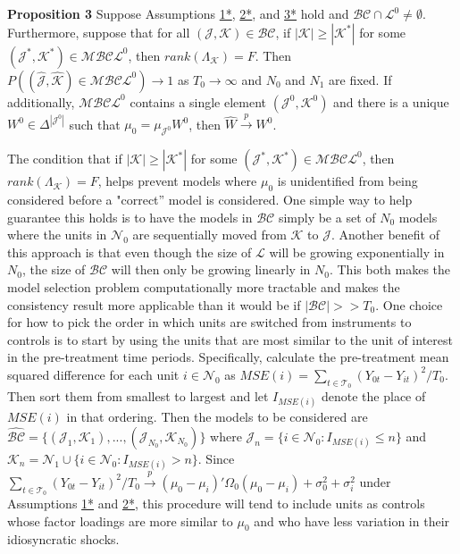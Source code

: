 \documentclass{article}
\begin{document}
\textbf{Proposition 3}\label{P3} Suppose Assumptions \hyperref[A1*]{1*}, \hyperref[A2*]{2*}, and \hyperref[A3*]{3*} hold and $\mathcal{BC} \cap \mathcal{L}^0 \ne \emptyset$. Furthermore, suppose that for all $(\mathcal{J},\mathcal{K}) \in \mathcal{BC}$, if $|\mathcal{K}| \geq |\mathcal{K}^*|$ for some $(\mathcal{J}^*,\mathcal{K}^*) \in \mathcal{MBCL}^0$, then $rank(\Lambda_{\mathcal{K}}) = F$. Then $P((\hat{\mathcal{J}},\hat{\mathcal{K}}) \in \mathcal{MBCL}^0) \rightarrow 1$ as $T_0 \rightarrow \infty$ and $N_0$ and $N_1$ are fixed. If additionally, $\mathcal{MBCL}^0$ contains a single element $(\mathcal{J}^0,\mathcal{K}^0)$ and there is a unique $W^0 \in \Delta^{|\mathcal{J}^0|}$ such that $\mu_0 = \mu_{\mathcal{J}^0} W^0$, then $\hat{W} \overset{p}{\rightarrow} W^0$. 
\par
The condition that if $|\mathcal{K}| \geq |\mathcal{K}^*|$ for some $(\mathcal{J}^*,\mathcal{K}^*) \in \mathcal{MBCL}^0$, then $rank(\Lambda_{\mathcal{K}}) = F$, helps prevent models where $\mu_0$ is unidentified from being considered before a "correct” model is considered. One simple way to help guarantee this holds is to have the models in $\mathcal{BC}$ simply be a set of $N_0$ models where the units in $\mathcal{N}_0$ are sequentially moved from $\mathcal{K}$ to $\mathcal{J}$. Another benefit of this approach is that even though the size of $\mathcal{L}$ will be growing exponentially in $N_0$, the size of $\mathcal{BC}$ will then only be growing linearly in $N_0$. This both makes the model selection problem computationally more tractable and makes the consistency result more applicable than it would be if $|\mathcal{BC}| >> T_0$. One choice for how to pick the order in which units are switched from instruments to controls is to start by using the units that are most similar to the unit of interest in the pre-treatment time periods. Specifically, calculate the pre-treatment mean squared difference for each unit $i \in\mathcal{N}_0$ as $MSE(i) = \sum_{t \in \mathcal{T}_0}(Y_{0t} - Y_{it})^2/T_0$. Then sort them from smallest to largest and let $I_{MSE(i)}$ denote the place of $MSE(i)$ in that ordering. Then the models to be considered are $\hat{\mathcal{BC}} = \{(\mathcal{J}_1,\mathcal{K}_1), ... ,(\mathcal{J}_{N_0},\mathcal{K}_{N_0})\}$ where $\mathcal{J}_n = \{i \in \mathcal{N}_0 : I_{MSE(i)} \leq n\}$ and $\mathcal{K}_n = \mathcal{N}_1 \cup \{i \in \mathcal{N}_0 : I_{MSE(i)} > n\}$. Since $\sum_{t \in \mathcal{T}_0} (Y_{0t} - Y_{it})^2/T_0 \overset{p}{\rightarrow} (\mu_0 - \mu_i)'\Omega_0(\mu_0 - \mu_i) + \sigma_0^2 + \sigma_i^2$ under Assumptions \hyperref[A1*]{1*} and \hyperref[A2*]{2*}, this procedure will tend to include units as controls whose factor loadings are more similar to $\mu_0$ and who have less variation in their idiosyncratic shocks.
\end{document}
